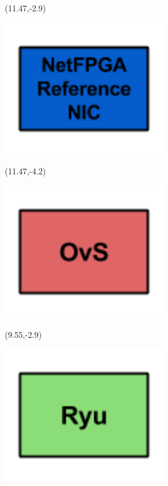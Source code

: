 \documentclass{beamer}
\begin{document}
\begin{frame}
\begin{textblock}{3}(11.47,-2.9)
\begin{minipage}{\textwidth}
\setlength{\parindent}{0pt}
\setlength{\parskip}{0.1cm}
\includegraphics[width=0.53\textwidth, right]{imagenes/buildingbnetfpga.png}
\end{minipage}
\end{textblock}

\begin{textblock}{3}(11.47,-4.2)
\begin{minipage}{\textwidth}
\setlength{\parindent}{0pt}
\setlength{\parskip}{0.1cm}
\includegraphics[width=0.53\textwidth, right]{imagenes/buildingblockovs.png}
\end{minipage}
\end{textblock}

\pause

\begin{textblock}{3}(9.55,-2.9)
\begin{minipage}{\textwidth}
\setlength{\parindent}{0pt}
\setlength{\parskip}{0.1cm}
\includegraphics[width=0.53\textwidth, right]{imagenes/buildingblockryu.png}
\end{minipage}
\end{textblock}

\end{frame}
\end{document}
